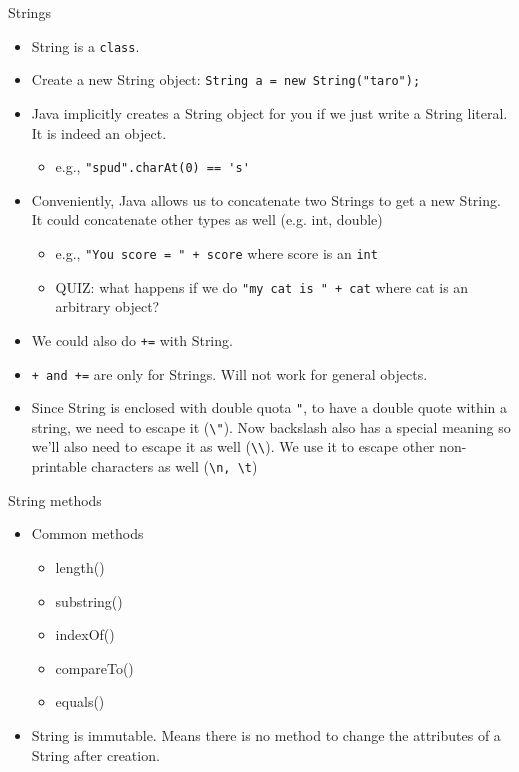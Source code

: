 \documentclass[aspectratio=169]{beamer}
\begin{document}
\begin{frame}[fragile]{Strings}
  \begin{itemize}
    \item String is a \verb|class|.
    \item Create a new String object: \verb|String a = new String("taro");|
    \item Java implicitly creates a String object for you if we just write a String literal. It is indeed an object.
      \begin{itemize}
        \item e.g., \verb|"spud".charAt(0) == 's'|
      \end{itemize}
    \item Conveniently, Java allows us to concatenate two Strings to get a new String. It could concatenate other types as well (e.g. int, double)
      \begin{itemize}
        \item e.g., \verb|"You score = " + score| where score is an \verb|int|
        \item \alert{QUIZ:} what happens if we do \verb|"my cat is " + cat| where cat is an arbitrary object?
      \end{itemize}
    \item We could also do \verb|+=| with String.
    \item \verb|+ and +=| are only for Strings. Will not work for general objects.
    \item Since String is enclosed with double quota \verb|"|, to have a double quote within a string, we need to escape it (\verb|\"|). Now backslash also
      has a special meaning so we'll also need to escape it as well (\verb|\\|). We use it to escape other non-printable characters as well (\verb|\n, \t|)
  \end{itemize}
\end{frame}

\begin{frame}[fragile]{String methods}
  \begin{itemize}
    \item Common methods
      \begin{itemize}
        \item length()
        \item substring()
        \item indexOf()
        \item compareTo()
        \item equals()
      \end{itemize}
    \item String is immutable. Means there is no method to change the attributes of a String after creation.
  \end{itemize}
\end{frame}
\end{document}
